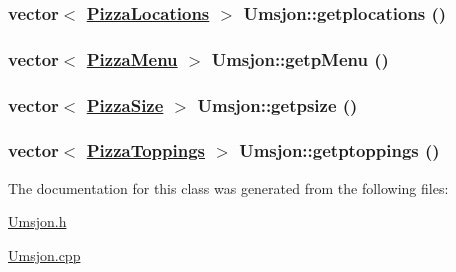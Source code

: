 \hypertarget{class_umsjon_a84f9abb849190a11dfcb3f0d5d619cc}{
\subsubsection[getplocations]{\setlength{\rightskip}{0pt plus 5cm}vector$<$ \hyperlink{class_pizza_locations}{Pizza\-Locations} $>$ Umsjon::getplocations ()}}
\label{class_umsjon_a84f9abb849190a11dfcb3f0d5d619cc}


\hypertarget{class_umsjon_729f51349769ff866a7cf5d79d381c2b}{
\subsubsection[getpMenu]{\setlength{\rightskip}{0pt plus 5cm}vector$<$ \hyperlink{class_pizza_menu}{Pizza\-Menu} $>$ Umsjon::getp\-Menu ()}}
\label{class_umsjon_729f51349769ff866a7cf5d79d381c2b}


\hypertarget{class_umsjon_fffa683bcf55b44d751ab146b21b3ae9}{
\subsubsection[getpsize]{\setlength{\rightskip}{0pt plus 5cm}vector$<$ \hyperlink{class_pizza_size}{Pizza\-Size} $>$ Umsjon::getpsize ()}}
\label{class_umsjon_fffa683bcf55b44d751ab146b21b3ae9}


\hypertarget{class_umsjon_63e370dface20065bb6dde6d38ea4287}{
\subsubsection[getptoppings]{\setlength{\rightskip}{0pt plus 5cm}vector$<$ \hyperlink{class_pizza_toppings}{Pizza\-Toppings} $>$ Umsjon::getptoppings ()}}
\label{class_umsjon_63e370dface20065bb6dde6d38ea4287}




The documentation for this class was generated from the following files:\begin{CompactItemize}
\item 
\hyperlink{_umsjon_8h}{Umsjon.h}\item 
\hyperlink{_umsjon_8cpp}{Umsjon.cpp}\end{CompactItemize}

